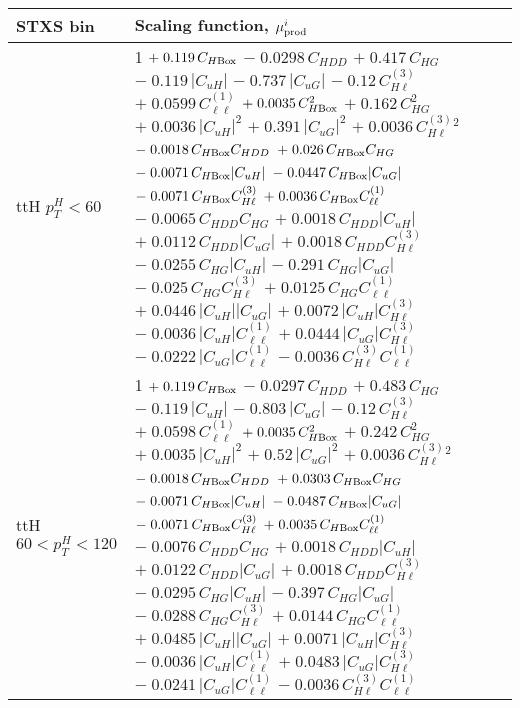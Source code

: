 \begin{tabular}{l|p{}}
    STXS bin & Scaling function, $\mu^i_{\rm{prod}}$ \\ \hline
    ttH $p_{T}^{H} < 60$ & 1 $+\;0.119\,C_{H\rm{Box}}$ $-\;0.0298\,C_{HDD}$ $+\;0.417\,C_{HG}$ $-\;0.119\,|C_{uH}|$ $-\;0.737\,|C_{uG}|$ $-\;0.12\,C^{(3)}_{H\ell}$ $+\;0.0599\,C^{(1)}_{\ell\ell}$ $+\;0.0035\,C_{H\rm{Box}}^{2}$ $+\;0.162\,C_{HG}^{2}$ $+\;0.0036\,|C_{uH}|^{2}$ $+\;0.391\,|C_{uG}|^{2}$ $+\;0.0036\,C^{(3)}_{H\ell}^{2}$ $-\;0.0018\,C_{H\rm{Box}}C_{HDD}$ $+\;0.026\,C_{H\rm{Box}}C_{HG}$ $-\;0.0071\,C_{H\rm{Box}}|C_{uH}|$ $-\;0.0447\,C_{H\rm{Box}}|C_{uG}|$ $-\;0.0071\,C_{H\rm{Box}}C^{(3)}_{H\ell}$ $+\;0.0036\,C_{H\rm{Box}}C^{(1)}_{\ell\ell}$ $-\;0.0065\,C_{HDD}C_{HG}$ $+\;0.0018\,C_{HDD}|C_{uH}|$ $+\;0.0112\,C_{HDD}|C_{uG}|$ $+\;0.0018\,C_{HDD}C^{(3)}_{H\ell}$ $-\;0.0255\,C_{HG}|C_{uH}|$ $-\;0.291\,C_{HG}|C_{uG}|$ $-\;0.025\,C_{HG}C^{(3)}_{H\ell}$ $+\;0.0125\,C_{HG}C^{(1)}_{\ell\ell}$ $+\;0.0446\,|C_{uH}||C_{uG}|$ $+\;0.0072\,|C_{uH}|C^{(3)}_{H\ell}$ $-\;0.0036\,|C_{uH}|C^{(1)}_{\ell\ell}$ $+\;0.0444\,|C_{uG}|C^{(3)}_{H\ell}$ $-\;0.0222\,|C_{uG}|C^{(1)}_{\ell\ell}$ $-\;0.0036\,C^{(3)}_{H\ell}C^{(1)}_{\ell\ell}$ \\
    ttH $60 < p_{T}^{H} < 120$ & 1 $+\;0.119\,C_{H\rm{Box}}$ $-\;0.0297\,C_{HDD}$ $+\;0.483\,C_{HG}$ $-\;0.119\,|C_{uH}|$ $-\;0.803\,|C_{uG}|$ $-\;0.12\,C^{(3)}_{H\ell}$ $+\;0.0598\,C^{(1)}_{\ell\ell}$ $+\;0.0035\,C_{H\rm{Box}}^{2}$ $+\;0.242\,C_{HG}^{2}$ $+\;0.0035\,|C_{uH}|^{2}$ $+\;0.52\,|C_{uG}|^{2}$ $+\;0.0036\,C^{(3)}_{H\ell}^{2}$ $-\;0.0018\,C_{H\rm{Box}}C_{HDD}$ $+\;0.0303\,C_{H\rm{Box}}C_{HG}$ $-\;0.0071\,C_{H\rm{Box}}|C_{uH}|$ $-\;0.0487\,C_{H\rm{Box}}|C_{uG}|$ $-\;0.0071\,C_{H\rm{Box}}C^{(3)}_{H\ell}$ $+\;0.0035\,C_{H\rm{Box}}C^{(1)}_{\ell\ell}$ $-\;0.0076\,C_{HDD}C_{HG}$ $+\;0.0018\,C_{HDD}|C_{uH}|$ $+\;0.0122\,C_{HDD}|C_{uG}|$ $+\;0.0018\,C_{HDD}C^{(3)}_{H\ell}$ $-\;0.0295\,C_{HG}|C_{uH}|$ $-\;0.397\,C_{HG}|C_{uG}|$ $-\;0.0288\,C_{HG}C^{(3)}_{H\ell}$ $+\;0.0144\,C_{HG}C^{(1)}_{\ell\ell}$ $+\;0.0485\,|C_{uH}||C_{uG}|$ $+\;0.0071\,|C_{uH}|C^{(3)}_{H\ell}$ $-\;0.0036\,|C_{uH}|C^{(1)}_{\ell\ell}$ $+\;0.0483\,|C_{uG}|C^{(3)}_{H\ell}$ $-\;0.0241\,|C_{uG}|C^{(1)}_{\ell\ell}$ $-\;0.0036\,C^{(3)}_{H\ell}C^{(1)}_{\ell\ell}$ \\

\end{tabular}
